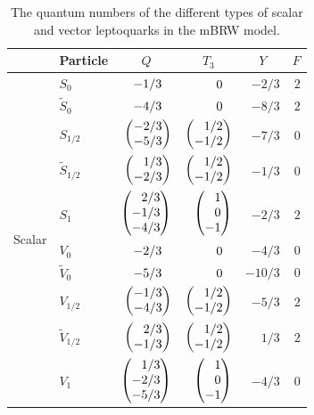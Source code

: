 \begin{table}[htb]
  \begin{center}
    \begin{tabular}{|l||l|r|r|r|r|}
\hline
      & \multicolumn{1}{c|}{Particle} & \multicolumn{1}{c|}{$Q$} & \multicolumn{1}{c|}{$T_3$} & \multicolumn{1}{c|}{$Y$} & \multicolumn{1}{c|}{$F$} \\
\hline
\hline
\multirow{10}{*}{Scalar} & $S_{0}$               & $-1/3\hphantom{\bigg)}$                            & $0\hphantom{\bigg)}$                              & $-2/3$ & $2$ \\
                         & $\widetilde{S}_{0}$   & $-4/3\hphantom{\bigg)}$                            & $0\hphantom{\bigg)}$                              & $-8/3$ & $2$ \\
\rule{0pt}{24pt}         & $S_{1/2}$             & $\doublet[r]{-2/3}{-5/3}$ & $\doublet[r]{1/2}{-1/2}$ & $-7/3$ & $0$ \\
\rule{0pt}{24pt}         & $\widetilde{S}_{1/2}$ & $\doublet[r]{1/3}{-2/3}$  & $\doublet[r]{1/2}{-1/2}$ & $-1/3$ & $0$ \\
\rule{0pt}{36pt}         & $S_{1}$               & $\triplet[r]{2/3}{-1/3}{-4/3}$       & $\triplet[r]{1\vphantom{/}}{0\vphantom{/}}{-1\vphantom{/}}$             & $-2/3$ & $2$ \\
\hline
\hline
\multirow{10}{*}{Vector} & $V_{0}$               & $-2/3\hphantom{\bigg)}$                            & $0\hphantom{\bigg)}$                              & $-4/3$  & $0$ \\
                         & $\widetilde{V}_{0}$   & $-5/3\hphantom{\bigg)}$                            & $0\hphantom{\bigg)}$                              & $-10/3$ & $0$ \\
\rule{0pt}{24pt}         & $V_{1/2}$             & $\doublet[r]{-1/3}{-4/3}$ & $\doublet[r]{1/2}{-1/2}$ & $-5/3$  & $2$ \\
\rule{0pt}{24pt}         & $\widetilde{V}_{1/2}$ & $\doublet[r]{2/3}{-1/3}$  & $\doublet[r]{1/2}{-1/2}$ & $1/3$   & $2$ \\
\rule{0pt}{36pt}         & $V_{1}$               & $\triplet[r]{1/3}{-2/3}{-5/3}$       & $\triplet[r]{1\vphantom{/}}{0\vphantom{/}}{-1\vphantom{/}}$             & $-4/3$  & $0$ \\
\hline
    \end{tabular}
    \caption{The quantum numbers of the different types of scalar and vector leptoquarks in the mBRW model.}
    \label{tab:lq-num}
  \end{center}
\end{table}

